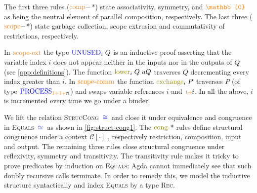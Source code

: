 \documentclass[sigplan,10pt,anonymous,review]{acmart}
\theoremstyle{definition}
\newcommand{\type}[1]{\textcolor{blue}{\operatorname{#1}}}
\newcommand{\constr}[1]{\textcolor{orange}{\operatorname{#1}}}
\newcommand{\func}[1]{\textcolor{olive}{\operatorname{#1}}}
\newcommand{\PO}{\constr{\mathbb{0}}}
\newcommand{\suc}{\constr{\scriptstyle 1+}}
\newcommand{\Process}{\type{PROCESS}}
\newcommand{\Unused}{\type{UNUSED}}
\newcommand{\eq}[1]{\, \type{\simeq}_{#1} \,}
\newcommand{\eqeq}{\, \type{\cong} \,}
\begin{document}
The first three rules ($\constr{comp}-$*) state associativity, symmetry, and $\PO$ as being the neutral element of parallel composition, respectively.
The last three ($\constr{scope}-$*) state garbage collection, scope extrusion and commutativity of restrictions, respectively.

In $\constr{scope-ext}$ the type $\Unused_i \; Q$ is an inductive proof asserting that the variable index $i$ does not appear neither in the inputs nor in the outputs of $Q$ (see \autoref{app:definitions}).
The function $\func{lower}_i \; Q \; uQ$ traverses $Q$ decrementing every index greater than $i$.
In $\constr{scope-comm}$ the function $\func{exchange}_i \; P$ traverses $P$ (of type $\allowbreak \Process_{\suc \suc n}$) and swaps variable references $i$ and $\suc i$.
In all the above, $i$ is incremented every time we go under a binder.
  
We lift the relation \textsc{StrucCong} $\eqeq{}$ and close it under equivalence and congruence in \textsc{Equals} $\eq{}$ as shown in \autoref{fig:struct-cong1}.
The $\func{cong-}$* rules define structural congruence under a context $\mathcal{C}[\cdot]$ \cite{Sangio01}, respectively restriction, composition, input and output.
The remaining three rules close structural congruence under reflexivity, symmetry and transitivity. 
The transitivity rule makes it tricky to prove predicates by induction on \textsc{Equals}: Agda cannot immediately see that such doubly recursive calls terminate.
In order to remedy this, we model the inductive structure syntactically and index \textsc{Equals} by a type \textsc{Rec}.
\end{document}
